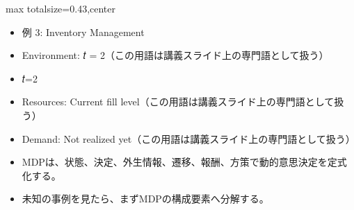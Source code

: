 \clearpage
{}
\begin{minipage}[t]{0.405\textwidth}
\begin{adjustbox}{max totalsize={\textwidth}{0.43\textheight},center}
\begin{minipage}{\textwidth}\scriptsize
{}\begin{itemize}
\item 例 3: Inventory Management
\item Environment: 𝑡 = 2（この用語は講義スライド上の専門語として扱う）
\item 𝑡=2
\item Resources: Current fill level（この用語は講義スライド上の専門語として扱う）
\item Demand: Not realized yet（この用語は講義スライド上の専門語として扱う）
\end{itemize}\begin{itemize}
\item MDPは、状態、決定、外生情報、遷移、報酬、方策で動的意思決定を定式化する。
\item 未知の事例を見たら、まずMDPの構成要素へ分解する。
\end{itemize}
\end{minipage}
\end{adjustbox}
\end{minipage}\hfill
